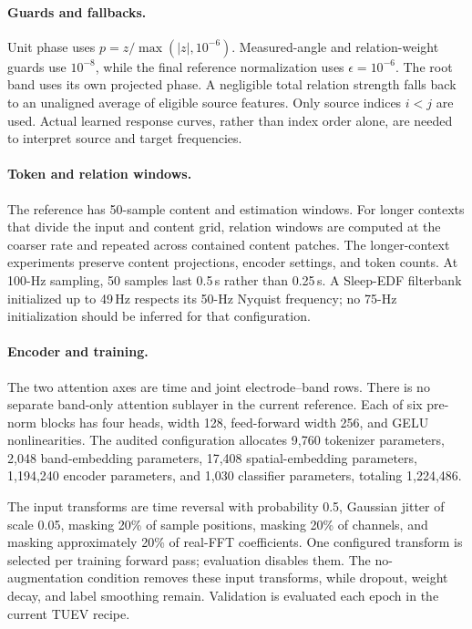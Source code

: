 \documentclass[10pt,twocolumn,letterpaper]{article}
\begin{document}
\paragraph{Guards and fallbacks.}
Unit phase uses $p=z/\max(|z|,10^{-6})$.
Measured-angle and relation-weight guards use $10^{-8}$, while the final
reference normalization uses $\epsilon=10^{-6}$.
The root band uses its own projected phase. A negligible total relation
strength falls back to an unaligned average of eligible source features.
Only source indices $i<j$ are used. Actual learned response curves,
rather than index order alone, are needed to interpret source and target
frequencies.

\paragraph{Token and relation windows.}
The reference has 50-sample content and estimation windows. For longer
contexts that divide the input and content grid, relation windows are
computed at the coarser rate and repeated across contained content
patches. The longer-context experiments preserve content projections,
encoder settings, and token counts. At 100-Hz sampling, 50 samples last
0.5\,s rather than 0.25\,s. A Sleep-EDF filterbank initialized up to
49\,Hz respects its 50-Hz Nyquist frequency; no 75-Hz initialization
should be inferred for that configuration.

\paragraph{Encoder and training.}
The two attention axes are time and joint electrode--band rows.
There is no separate band-only attention sublayer in the current
reference. Each of six pre-norm blocks has four heads, width 128,
feed-forward width 256, and GELU nonlinearities.
The audited configuration allocates 9,760 tokenizer parameters,
2,048 band-embedding parameters, 17,408 spatial-embedding parameters,
1,194,240 encoder parameters, and 1,030 classifier parameters,
totaling 1,224,486.

The input transforms are time reversal with probability 0.5, Gaussian
jitter of scale 0.05, masking 20\% of sample positions, masking 20\%
of channels, and masking approximately 20\% of real-FFT coefficients.
One configured transform is selected per training forward pass;
evaluation disables them. The no-augmentation condition removes these
input transforms, while dropout, weight decay, and label smoothing
remain. Validation is evaluated each epoch in the current TUEV recipe.
\end{document}
